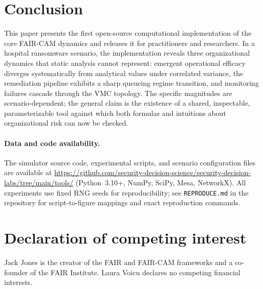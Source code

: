 \documentclass[11pt,a4paper]{article}
\begin{document}
\section{Conclusion}

This paper presents the first open-source computational implementation of the core FAIR-CAM dynamics and releases it for practitioners and researchers. In a hospital ransomware scenario, the implementation reveals three organizational dynamics that static analysis cannot represent: emergent operational efficacy diverges systematically from analytical values under correlated variance, the remediation pipeline exhibits a sharp queueing regime transition, and monitoring failures cascade through the VMC topology. The specific magnitudes are scenario-dependent; the general claim is the existence of a shared, inspectable, parameterizable tool against which both formulas and intuitions about organizational risk can now be checked.

\paragraph{Data and code availability.} The simulator source code, experimental scripts, and scenario configuration files are available at \url{https://github.com/security-decision-science/security-decision-labs/tree/main/tools/} (Python~3.10+, NumPy, SciPy, Mesa, NetworkX). All experiments use fixed RNG seeds for reproducibility; see \texttt{REPRODUCE.md} in the repository for script-to-figure mappings and exact reproduction commands.

\section*{Declaration of competing interest}
Jack Jones is the creator of the FAIR and FAIR-CAM frameworks and a co-founder of the FAIR Institute. Laura Voicu declares no competing financial interests.


\end{document}
